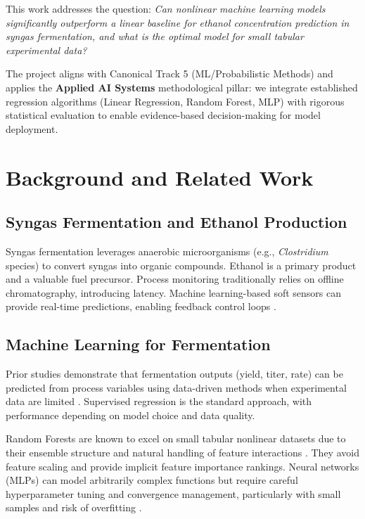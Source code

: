 \documentclass[conference]{IEEEtran}
\begin{document}
This work addresses the question: \textit{Can nonlinear machine learning models significantly outperform a linear baseline for ethanol concentration prediction in syngas fermentation, and what is the optimal model for small tabular experimental data?}

The project aligns with Canonical Track 5 (ML/Probabilistic Methods) and applies the \textbf{Applied AI Systems} methodological pillar: we integrate established regression algorithms (Linear Regression, Random Forest, MLP) with rigorous statistical evaluation to enable evidence-based decision-making for model deployment.

\section{Background and Related Work}

\subsection{Syngas Fermentation and Ethanol Production}
Syngas fermentation leverages anaerobic microorganisms (e.g., \textit{Clostridium} species) to convert syngas into organic compounds. Ethanol is a primary product and a valuable fuel precursor. Process monitoring traditionally relies on offline chromatography, introducing latency. Machine learning-based soft sensors can provide real-time predictions, enabling feedback control loops \cite{roell2022}.

\subsection{Machine Learning for Fermentation}
Prior studies demonstrate that fermentation outputs (yield, titer, rate) can be predicted from process variables using data-driven methods when experimental data are limited \cite{roell2022}. Supervised regression is the standard approach, with performance depending on model choice and data quality.

Random Forests are known to excel on small tabular nonlinear datasets due to their ensemble structure and natural handling of feature interactions \cite{breiman2001}. They avoid feature scaling and provide implicit feature importance rankings. Neural networks (MLPs) can model arbitrarily complex functions but require careful hyperparameter tuning and convergence management, particularly with small samples and risk of overfitting \cite{rumelhart1986}.
\end{document}
